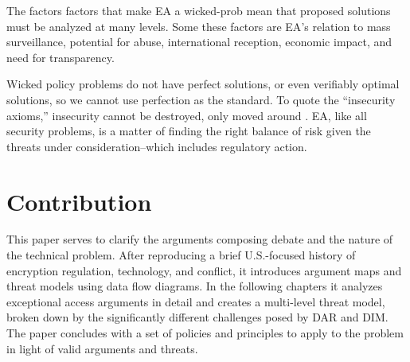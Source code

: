  The factors factors that make \ac{EA} a \ac{wicked-prob} mean that
proposed solutions must be analyzed at many levels. Some these factors are \ac{EA}'s relation to mass surveillance,
potential for abuse, international reception, economic impact, and need for transparency.

 Wicked policy problems do not have perfect solutions, or even verifiably
optimal solutions, so we cannot use perfection as the standard. To quote the ``insecurity axioms,'' insecurity cannot be
destroyed, only moved around \cite{nrc_schneider_1999}. \Ac{EA}, like all security problems, is a matter of finding the
right balance of risk given the threats under consideration--which includes regulatory action.

\principlesend


\section{Contribution}
\label{sec-contribution}

This paper serves to clarify the arguments composing debate and the nature of the technical problem. After reproducing a
brief U.S.-focused history of encryption regulation, technology, and conflict, it introduces argument maps and threat
models using data flow diagrams. In the following chapters it analyzes exceptional access arguments in detail and
creates a multi-level threat model, broken down by the significantly different challenges posed by \acl{DAR} and
\acl{DIM}. The paper concludes with a set of policies and principles to apply to the problem in light of valid arguments
and threats.
